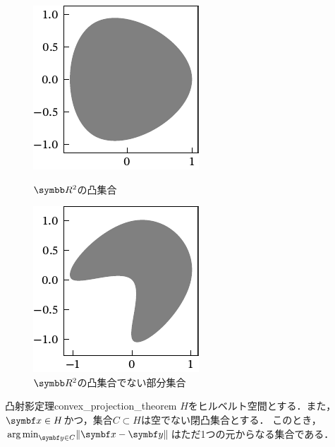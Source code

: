 \documentclass[../../main]{subfiles}
\begin{document}
\begin{figure}[htbp]
  \begin{minipage}{0.5\linewidth}
    \centering
    \includegraphics{convex.pdf}
    \caption{\(\numset{R}^2\)の凸集合}
  \end{minipage}%
  \begin{minipage}{0.5\linewidth}
    \centering
    \includegraphics{non_convex.pdf}
    \caption{\(\numset{R}^2\)の凸集合でない部分集合}
  \end{minipage}
\end{figure}

\begin{theorem}{凸射影定理}{convex_projection_theorem}
  \(H\)をヒルベルト空間とする．また，\(\vect{x}\in H\)かつ，集合\(C\subset H\)は空でない閉凸集合とする．
  このとき，\(\argmin_{\vect{y}\in C}\vnorm{\vect{x}-\vect{y}}\)はただ1つの元からなる集合である．
\end{theorem}
\end{document}
